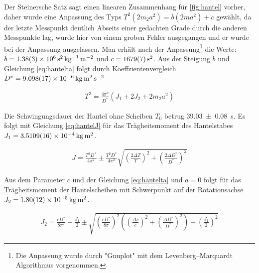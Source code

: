 Der Steinersche Satz sagt einen linearen Zusammenhang für \cref{fig:hantel} vorher, daher wurde eine Anpassung des Typs $T^2(2m_2 a^2)=b (2m a^2)+c$ gewählt, da der letzte Messpunkt deutlich Abseits einer gedachten Grade durch die anderen Messpunkte lag, wurde hier von einem groben Fehler ausgegangen und er wurde bei der Anpassung ausgelassen.
Man erhält nach der Anpassung\footnote{Die Anpassung wurde durch "Gnuplot" mit dem Levenberg–Marquardt Algorithmus vorgenommen.  } die Werte: $ b               = \SI{1.38 \pm 0.03 e+006}{\second \squared \per \kilogram \per \metre \squared} $ und $c               = \SI{ 1679+-7 }   {\second \squared}$. Aus der Steigung $b$ und Gleichung \ref{eq:hantelta} folgt durch Koeffzientenvergleich $D^*=\SI{9.098+-0.017e-6}{\kilogram \metre \squared \per \second \squared }$






\begin{align}
	T^2= \frac{4 \pi^2}{D^*}(J_1+2J_2+2m_2 a^2)
	\label{eq:hantelta}
\end{align}



Die Schwingungsdauer der Hantel ohne Scheiben $T_0$  betrug \SI{39,03 \pm 0.08}{s}. Es folgt mit Gleichung \ref{eq:hantelJ} für das Trägheitsmoment des Hantelstabes $J_1 = \SI{3.5109+-0.0016e-4}{\kilogram \metre \squared}$.



\begin{align}
	J=\frac{T^2 D^*}{4 \pi^2} \pm \frac{T^2 D^*}{4 \pi^2} \sqrt{
	\left(\frac{2 \Delta T}{T} \right)^2 + 	\left(\frac{2 \Delta D^*}{D^*} \right)^2 }
\label{eq:hantelJ}
\end{align}








Aus dem Parameter $c$ und der Gleichung \ref{eq:hantelta} und $a=0$  folgt für das Trägheitsmoment der Hantelscheiben mit Schwerpunkt auf der Rotationsachse $J_2=\SI{1.80+-0.12e-5 }{\kilogram \metre \squared}$.


\begin{align}
J_2=\frac{c D^*}{8 \pi ^2}-\frac{J_1}{2} \pm \sqrt{\left( \frac{c D^*}{8 \pi}\right) ^2\left( \left( \frac{\Delta c}{c}\right) ^2+  \left( \frac{\Delta D^*}{D^*}\right) ^2\right) + \left(\frac{J_1}{2}\right)^2 }
\end{align}




